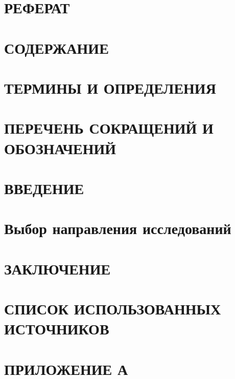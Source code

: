 

\section*{РЕФЕРАТ}

\section*{СОДЕРЖАНИЕ}

\section*{ТЕРМИНЫ И ОПРЕДЕЛЕНИЯ}

\section*{ПЕРЕЧЕНЬ СОКРАЩЕНИЙ И ОБОЗНАЧЕНИЙ}

\section*{ВВЕДЕНИЕ}

\section{Выбор направления исследований}

\section*{ЗАКЛЮЧЕНИЕ}

\section*{СПИСОК ИСПОЛЬЗОВАННЫХ ИСТОЧНИКОВ}

\section*{ПРИЛОЖЕНИЕ А}


